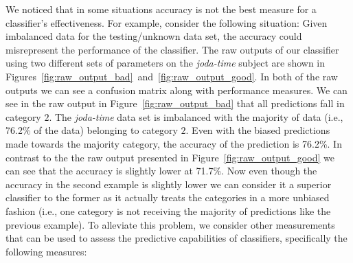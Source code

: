 \begin{sidewaysfigure}[!tb]
  \centering
  \caption{Raw output of training on \emph{joda-time} then predicting on its unknowns using the parameters \emph{cost}=0.03125 and \emph{gamma}=0.0078125.}
  \label{fig:raw_output_bad}
  \begin{minipage}{.95\textheight}
  \scriptsize{
  
  }
  \end{minipage}
  
  \vspace{3em}

  \centering
  \caption{Raw output of training on \emph{joda-time} then predicting on its unknowns using the parameters \emph{cost}=8 and \emph{gamma}=0.125.}
  \label{fig:raw_output_good}
  \begin{minipage}{.95\textheight}
  \scriptsize{
  
  }
  \end{minipage}
\end{sidewaysfigure}
\afterpage\clearpage

We noticed that in some situations accuracy is not the best measure for a classifier's effectiveness. For example, consider the following situation: Given imbalanced data for the testing/unknown data set, the accuracy could misrepresent the performance of the classifier. The raw outputs of our classifier using two different sets of parameters on the \emph{joda-time} subject are shown in Figures~\ref{fig:raw_output_bad}~and~\ref{fig:raw_output_good}. In both of the raw outputs we can see a confusion matrix along with performance measures. We can see in the raw output in Figure~\ref{fig:raw_output_bad} that all predictions fall in category $2$. The \emph{joda-time} data set is imbalanced with the majority of data (i.e., 76.2\% of the data) belonging to category $2$. Even with the biased predictions made towards the majority category, the accuracy of the prediction is 76.2\%. In contrast to the the raw output presented in Figure~\ref{fig:raw_output_good} we can see that the accuracy is slightly lower at 71.7\%. Now even though the accuracy in the second example is slightly lower we can consider it a superior classifier to the former as it actually treats the categories in a more unbiased fashion (i.e., one category is not receiving the majority of predictions like the previous example). To alleviate this problem, we consider other measurements that can be used to assess the predictive capabilities of classifiers, specifically the following measures:

